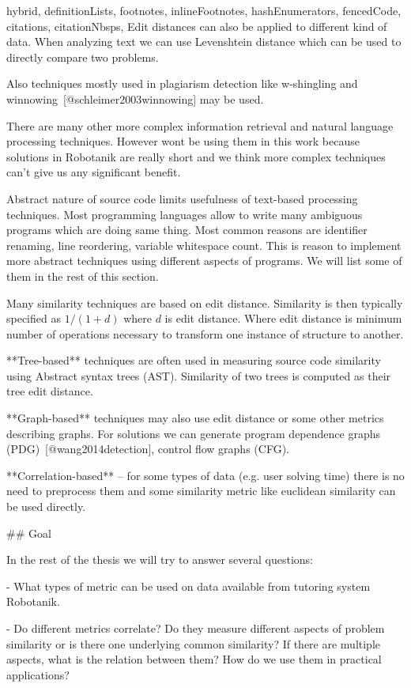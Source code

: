 \documentclass[
  digital, %
  table,   %
  nolof,     %
  nolot,     %
  nocover
]{fithesis3}
\begin{document}
\begin{markdown*}{%
  hybrid,
  definitionLists,
  footnotes,
  inlineFootnotes,
  hashEnumerators,
  fencedCode,
  citations,
  citationNbsps,
}
Edit distances can also be applied to different kind of data. When analyzing text we can use Levenshtein distance which can be used to directly compare two problems.

Also techniques mostly used in plagiarism detection like w-shingling and winnowing~[@schleimer2003winnowing] may be used.

There are many other more complex information retrieval and natural language processing techniques. However wont be using them in this work because solutions in Robotanik are really short and we think more complex techniques can't give us any significant benefit.

Abstract nature of source code limits usefulness of text-based processing techniques. Most programming languages allow to write many ambiguous programs which are doing same thing. Most common reasons are identifier renaming, line reordering, variable whitespace count. This is reason to implement more abstract techniques using different aspects of programs. We will list some of them in the rest of this section.

Many similarity techniques are based on edit distance. Similarity is then typically specified as $1/(1+d)$ where $d$ is edit distance. Where edit distance is minimum number of operations necessary to transform one instance of structure to another.

**Tree-based** techniques are often used in measuring source code similarity using Abstract syntax trees (AST). Similarity of two trees is computed as their tree edit distance.

**Graph-based** techniques may also use edit distance or some other metrics describing graphs. For solutions we can generate program dependence graphs (PDG)~[@wang2014detection], control flow graphs (CFG).

**Correlation-based** -- for some types of data (e.g. user solving time) there is no need to preprocess them and some similarity metric like euclidean similarity can be used directly.

## Goal

In the rest of the thesis we will try to answer several questions:

- What types of metric can be used on data available from tutoring system Robotanik.

- Do different metrics correlate? Do they measure different aspects of problem similarity or is there one underlying common similarity? If there are multiple aspects, what is the relation between them? How do we use them in practical applications?


\end{markdown*}
\end{document}
